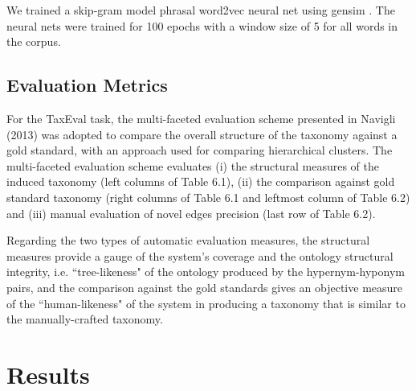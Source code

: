 We trained a skip-gram model phrasal word2vec neural net \citep{mikolov2013efficient} using gensim \citep{rehureklrec}. The neural nets were trained for 100 epochs with a window size of 5 for all words in the corpus.

\subsection{Evaluation Metrics}

For the TaxEval task, the multi-faceted evaluation scheme presented in Navigli (2013) was adopted to compare the overall structure of the taxonomy against a gold standard, with an approach used for comparing hierarchical clusters. The multi-faceted evaluation scheme evaluates (i) the structural measures of the induced taxonomy (left columns of Table 6.1), (ii) the comparison against gold standard taxonomy (right columns of Table 6.1 and leftmost column of Table 6.2) and (iii) manual evaluation of novel edges precision (last row of Table 6.2). 

Regarding the two types of automatic evaluation measures, the structural measures provide a gauge of the system's coverage and the ontology structural integrity, i.e. ``tree-likeness" of the ontology produced by the hypernym-hyponym pairs, and the comparison against the gold standards gives an objective measure of the ``human-likeness" of the system in producing a taxonomy that is similar to the manually-crafted taxonomy.

\section{Results}


